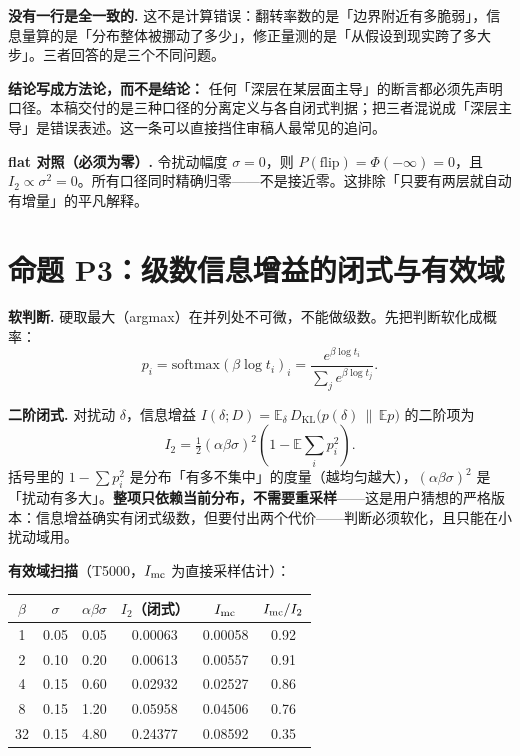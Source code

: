 \documentclass[12pt]{ctexart}
\newcommand{\E}{\mathbb{E}}
\newcommand{\flip}{\mathrm{flip}}
\begin{document}
\textbf{没有一行是全一致的.} 这不是计算错误：翻转率数的是「边界附近有多脆弱」，信息量算的是「分布整体被挪动了多少」，修正量测的是「从假设到现实跨了多大步」。三者回答的是三个不同问题。

\textbf{结论写成方法论，而不是结论：} 任何「深层在某层面主导」的断言都必须先声明口径。本稿交付的是三种口径的分离定义与各自闭式判据；把三者混说成「深层主导」是错误表述。这一条可以直接挡住审稿人最常见的追问。

\textbf{flat 对照（必须为零）.} 令扰动幅度 $\sigma=0$，则 $P(\flip)=\Phi(-\infty)=0$，且 $I_2\propto\sigma^2=0$。所有口径同时精确归零——不是接近零。这排除「只要有两层就自动有增量」的平凡解释。

\section{命题 P3：级数信息增益的闭式与有效域}

\textbf{软判断.} 硬取最大（argmax）在并列处不可微，不能做级数。先把判断软化成概率：
\[
p_i=\mathrm{softmax}(\beta\log t_i)_i=\frac{e^{\beta\log t_i}}{\sum_j e^{\beta\log t_j}}.
\]

\textbf{二阶闭式.} 对扰动 $\delta$，信息增益 $I(\delta;D)=\E_\delta\,D_{\mathrm{KL}}\big(p(\delta)\,\|\,\E p\big)$ 的二阶项为
\[
\boxed{I_2=\tfrac12(\alpha\beta\sigma)^2\left(1-\E\sum_i p_i^2\right)} .
\]
括号里的 $1-\sum p_i^2$ 是分布「有多不集中」的度量（越均匀越大），$(\alpha\beta\sigma)^2$ 是「扰动有多大」。\textbf{整项只依赖当前分布，不需要重采样}——这是用户猜想的严格版本：信息增益确实有闭式级数，但要付出两个代价——判断必须软化，且只能在小扰动域用。

\textbf{有效域扫描}（T5000，$I_{\rm mc}$ 为直接采样估计）：

\begin{table}[htbp]
\centering\small
\begin{tabular}{@{}cccccc@{}}
\toprule
$\beta$ & $\sigma$ & $\alpha\beta\sigma$ & $I_2$（闭式） & $I_{\rm mc}$ & $I_{\rm mc}/I_2$ \\
\midrule
1  & 0.05 & 0.05 & 0.00063 & 0.00058 & 0.92 \\
2  & 0.10 & 0.20 & 0.00613 & 0.00557 & 0.91 \\
4  & 0.15 & 0.60 & 0.02932 & 0.02527 & 0.86 \\
8  & 0.15 & 1.20 & 0.05958 & 0.04506 & 0.76 \\
32 & 0.15 & 4.80 & 0.24377 & 0.08592 & 0.35 \\
\bottomrule
\end{tabular}
\end{table}
\end{document}
